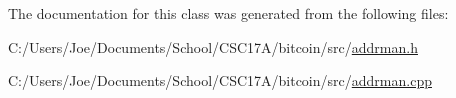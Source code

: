 The documentation for this class was generated from the following files\+:\begin{DoxyCompactItemize}
\item 
C\+:/\+Users/\+Joe/\+Documents/\+School/\+C\+S\+C17\+A/bitcoin/src/\hyperlink{addrman_8h}{addrman.\+h}\item 
C\+:/\+Users/\+Joe/\+Documents/\+School/\+C\+S\+C17\+A/bitcoin/src/\hyperlink{addrman_8cpp}{addrman.\+cpp}\end{DoxyCompactItemize}
